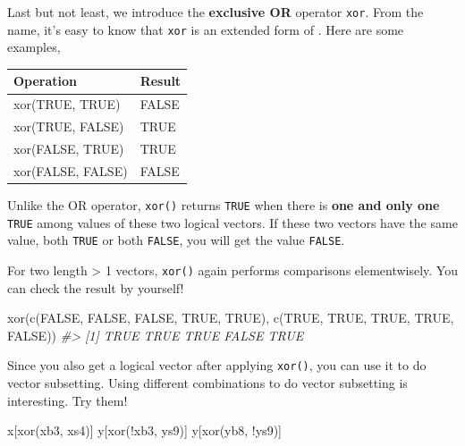 \documentclass[
]{book}
\newenvironment{Shaded}{\begin{snugshade}}{\end{snugshade}}
\newcommand{\CommentTok}[1]{\textcolor[rgb]{0.56,0.35,0.01}{\textit{#1}}}
\newcommand{\ConstantTok}[1]{\textcolor[rgb]{0.00,0.00,0.00}{#1}}
\newcommand{\FunctionTok}[1]{\textcolor[rgb]{0.00,0.00,0.00}{#1}}
\newcommand{\NormalTok}[1]{#1}
\newcommand{\SpecialCharTok}[1]{\textcolor[rgb]{0.00,0.00,0.00}{#1}}
\begin{document}
Last but not least, we introduce the \textbf{exclusive OR} operator \texttt{xor}. From the name, it's easy to know that \texttt{xor} is an extended form of \texttt{\textbar{}}. Here are some examples,

\begin{tabular}{l|l}
\hline
Operation & Result\\
\hline
xor(TRUE, TRUE) & FALSE\\
\hline
xor(TRUE, FALSE) & TRUE\\
\hline
xor(FALSE, TRUE) & TRUE\\
\hline
xor(FALSE, FALSE) & FALSE\\
\hline
\end{tabular}

Unlike the OR operator, \texttt{xor()} returns \texttt{TRUE} when there is \textbf{one and only one} \texttt{TRUE} among values of these two logical vectors. If these two vectors have the same value, both \texttt{TRUE} or both \texttt{FALSE}, you will get the value \texttt{FALSE}.

For two length \textgreater{} 1 vectors, \texttt{xor()} again performs comparisons elementwisely. You can check the result by yourself!

\begin{Shaded}
\begin{Highlighting}[]
\FunctionTok{xor}\NormalTok{(}\FunctionTok{c}\NormalTok{(}\ConstantTok{FALSE}\NormalTok{, }\ConstantTok{FALSE}\NormalTok{, }\ConstantTok{FALSE}\NormalTok{, }\ConstantTok{TRUE}\NormalTok{, }\ConstantTok{TRUE}\NormalTok{), }\FunctionTok{c}\NormalTok{(}\ConstantTok{TRUE}\NormalTok{, }\ConstantTok{TRUE}\NormalTok{, }\ConstantTok{TRUE}\NormalTok{, }\ConstantTok{TRUE}\NormalTok{, }\ConstantTok{FALSE}\NormalTok{))}
\CommentTok{\#\textgreater{} [1]  TRUE  TRUE  TRUE FALSE  TRUE}
\end{Highlighting}
\end{Shaded}

Since you also get a logical vector after applying \texttt{xor()}, you can use it to do vector subsetting. Using different combinations to do vector subsetting is interesting. Try them!

\begin{Shaded}
\begin{Highlighting}[]
\NormalTok{x[}\FunctionTok{xor}\NormalTok{(xb3, xs4)]}
\NormalTok{y[}\FunctionTok{xor}\NormalTok{(}\SpecialCharTok{!}\NormalTok{xb3, ys9)]}
\NormalTok{y[}\FunctionTok{xor}\NormalTok{(yb8, }\SpecialCharTok{!}\NormalTok{ys9)]}
\end{Highlighting}
\end{Shaded}
\end{document}
